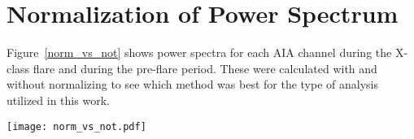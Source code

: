 \appendix
\section{Normalization of Power Spectrum}

Figure~\ref{norm_vs_not} shows power spectra for each AIA channel
during the X-class flare and during the pre-flare period.
These were calculated with and without normalizing to see which
method was best for the type of analysis utilized in this work.

\begin{figure*}\centering
    \texttt{[image: norm\_vs\_not.pdf]}
    \caption{Fourier power spectrum for quiet vs. flaring times,
    comparing calculations without normalizing (left panels) to
    those with normalizing (right panels) for both AIA 1600\AA{}
    (top) and AIA 1700\AA{} (bottom).
    All spectra were obtained by applying a Fourier transform
    to the integrated emission from AR 11158.
    \label{norm_vs_not}}
\end{figure*}


